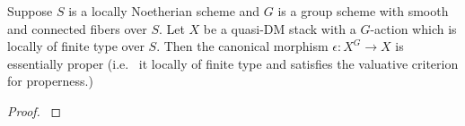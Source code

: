 \begin{proposition}\label{rl-000N}
  Suppose $S$ is a locally Noetherian scheme and \(G\) is a group scheme with smooth and connected fibers over \(S\). Let \(X\) be a quasi-DM stack with a \(G\)-action which is locally of finite type over \(S\). Then the canonical morphism \(\epsilon:X^{G}\to X\) is essentially proper (i.e. \ it locally of finite type and satisfies the valuative criterion for properness.)
\end{proposition}
\begin{proof}
  \cite[Proposition A.22]{aranha-khan-latyntsev-etal_VirtualLocalizationRevisited2025}
\end{proof}
